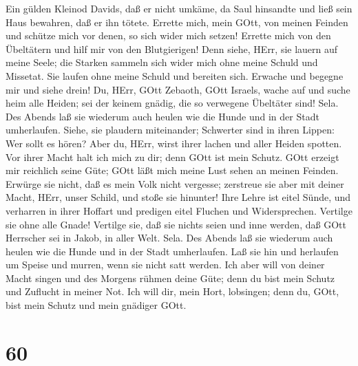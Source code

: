  Ein gülden Kleinod Davids, daß er nicht umkäme, da Saul
hinsandte und ließ sein Haus bewahren, daß er ihn tötete. 
Errette mich, mein GOtt, von meinen Feinden und schütze mich vor denen,
so sich wider mich setzen!  Errette mich von den Übeltätern
und hilf mir von den Blutgierigen!  Denn siehe, HErr, sie
lauern auf meine Seele; die Starken sammeln sich wider mich ohne meine
Schuld und Missetat.  Sie laufen ohne meine Schuld und
bereiten sich. Erwache und begegne mir und siehe drein!  Du,
HErr, GOtt Zebaoth, GOtt Israels, wache auf und suche heim alle Heiden;
sei der keinem gnädig, die so verwegene Übeltäter sind! Sela.
 Des Abends laß sie wiederum auch heulen wie die Hunde und
in der Stadt umherlaufen.  Siehe, sie plaudern miteinander;
Schwerter sind in ihren Lippen: Wer sollt es hören?  Aber
du, HErr, wirst ihrer lachen und aller Heiden spotten.  Vor
ihrer Macht halt ich mich zu dir; denn GOtt ist mein Schutz.
 GOtt erzeigt mir reichlich seine Güte; GOtt läßt mich
meine Lust sehen an meinen Feinden.  Erwürge sie nicht, daß
es mein Volk nicht vergesse; zerstreue sie aber mit deiner Macht, HErr,
unser Schild, und stoße sie hinunter!  Ihre Lehre ist eitel
Sünde, und verharren in ihrer Hoffart und predigen eitel Fluchen und
Widersprechen.  Vertilge sie ohne alle Gnade! Vertilge sie,
daß sie nichts seien und inne werden, daß GOtt Herrscher sei in Jakob,
in aller Welt. Sela.  Des Abends laß sie wiederum auch
heulen wie die Hunde und in der Stadt umherlaufen.  Laß sie
hin und herlaufen um Speise und murren, wenn sie nicht satt werden.
 Ich aber will von deiner Macht singen und des Morgens
rühmen deine Güte; denn du bist mein Schutz und Zuflucht in meiner Not.
 Ich will dir, mein Hort, lobsingen; denn du, GOtt, bist
mein Schutz und mein gnädiger GOtt.

\hypertarget{section-59}{%
\section{60}\label{section-59}}

